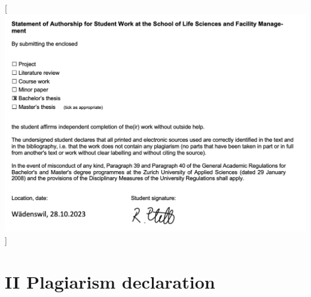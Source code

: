 \documentclass[
  letterpaper,
  DIV=11,
  numbers=noendperiod]{scrreprt}
\begin{document}
{[}\includegraphics[width=1\textwidth,height=\textheight]{text/annex_files/plagiarism_declaration.png}{]}
\normalcolor \newpage

\hypertarget{sec-annex_ii}{%
\section*{\texorpdfstring{\textsc{II} Plagiarism
declaration}{ Plagiarism declaration}}\label{sec-annex_ii}}

\end{document}
